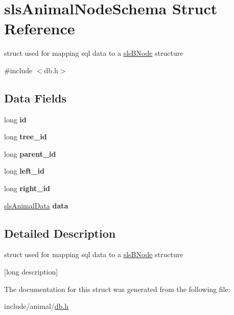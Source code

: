\hypertarget{structsls_animal_node_schema}{\section{sls\+Animal\+Node\+Schema Struct Reference}
\label{structsls_animal_node_schema}
}


struct used for mapping sql data to a \hyperlink{structsls_b_node}{sls\+B\+Node} structure  




{\ttfamily \#include $<$db.\+h$>$}

\subsection*{Data Fields}
\begin{DoxyCompactItemize}
\item 
\hypertarget{structsls_animal_node_schema_ae75d6dc5be4de117169cb7d7d6df4a48}{long {\bfseries id}}\label{structsls_animal_node_schema_ae75d6dc5be4de117169cb7d7d6df4a48}

\item 
\hypertarget{structsls_animal_node_schema_a9d47dbf1c4339e5f2f1e091c19d540f6}{long {\bfseries tree\+\_\+id}}\label{structsls_animal_node_schema_a9d47dbf1c4339e5f2f1e091c19d540f6}

\item 
\hypertarget{structsls_animal_node_schema_a2331ecb3576bf17d37016302f0f72b29}{long {\bfseries parent\+\_\+id}}\label{structsls_animal_node_schema_a2331ecb3576bf17d37016302f0f72b29}

\item 
\hypertarget{structsls_animal_node_schema_a3fe728dd35c758ab182a4fec4240a848}{long {\bfseries left\+\_\+id}}\label{structsls_animal_node_schema_a3fe728dd35c758ab182a4fec4240a848}

\item 
\hypertarget{structsls_animal_node_schema_a9f6008036aaf383466bc739dc850c3f8}{long {\bfseries right\+\_\+id}}\label{structsls_animal_node_schema_a9f6008036aaf383466bc739dc850c3f8}

\item 
\hypertarget{structsls_animal_node_schema_a689f4febcd87180aacdd798a599731eb}{\hyperlink{structsls_animal_data}{sls\+Animal\+Data} {\bfseries data}}\label{structsls_animal_node_schema_a689f4febcd87180aacdd798a599731eb}

\end{DoxyCompactItemize}


\subsection{Detailed Description}
struct used for mapping sql data to a \hyperlink{structsls_b_node}{sls\+B\+Node} structure 

\mbox{[}long description\mbox{]} 

The documentation for this struct was generated from the following file\+:\begin{DoxyCompactItemize}
\item 
include/animal/\hyperlink{db_8h}{db.\+h}\end{DoxyCompactItemize}
